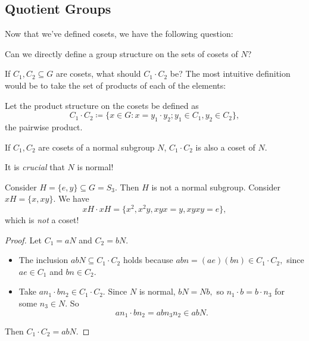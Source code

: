 \subsection{Quotient Groups}

Now that we've defined cosets, we have the following question:

\begin{qq}
Can we directly define a group structure on the sets of cosets of $N$?
\end{qq}

If $C_1, C_2 \subseteq G$ are cosets, what should $C_1 \cdot C_2$ be? The most intuitive definition would be to take the set of products of each of the elements:

\begin{definition}\label{product of cosets is cosets}
Let the product structure on the cosets be defined as \[C_1 \cdot C_2 \coloneqq \{x \in G: x = y_1 \cdot y_2 ; y_1 \in C_1, y_2 \in C_2\},\]
the pairwise product.
\end{definition}
\begin{theorem}
If $C_1, C_2$ are cosets of a normal subgroup $N$, $C_1 \cdot C_2$ is also a coset of $N.$ 
\end{theorem}

It is \emph{crucial} that $N$ is normal! 
\begin{example}
Consider $H = \{e, y\} \subseteq G = S_3.$ Then $H$ is not a normal subgroup. Consider $xH = \{x, xy\}$. We have \[
xH \cdot xH = \{x^2, x^2y, xyx = y, xyxy = e\},
\]
which is \emph{not} a coset!
\end{example}

\begin{proof}
Let $C_1 = aN$ and $C_2 = bN.$

\begin{itemize}
    \item The inclusion $abN \subseteq C_1 \cdot C_2$ holds because $abn = (ae)(bn) \in C_1 \cdot C_2,$ since $ae \in C_1$ and $bn \in C_2.$ 
    
    \item Take $an_1 \cdot bn_2 \in C_1 \cdot C_2.$ Since $N$ is normal, $bN = Nb,$ so $n_1 \cdot b = b \cdot n_3$ for some $n_3 \in N.$ So 
    \[
    an_1 \cdot bn_2 = abn_3n_2 \in abN.
    \]
\end{itemize}

Then $C_1 \cdot C_2 = abN.$ 

\end{proof}

